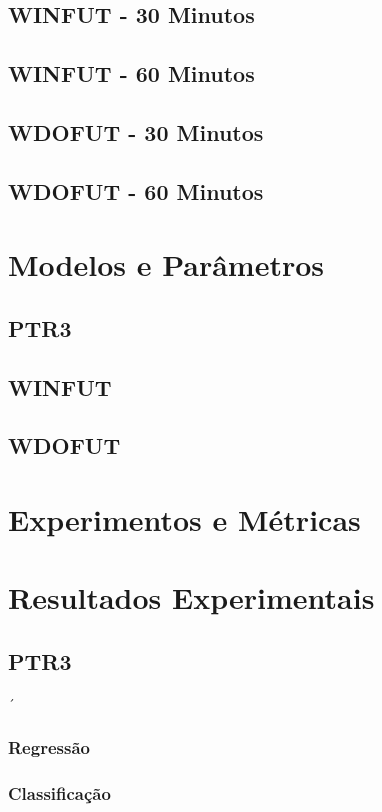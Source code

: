 \subsection{WINFUT - 30 Minutos}
\subsection{WINFUT - 60 Minutos}
\subsection{WDOFUT - 30 Minutos}
\subsection{WDOFUT - 60 Minutos}

\section{Modelos e Parâmetros}
\label{sec:modelos_parametros_resultados}
\subsection{PTR3}
\subsection{WINFUT}
\subsection{WDOFUT}

\section{Experimentos e Métricas}
\label{sec:experimentos _metricas}

\section{Resultados Experimentais}
\label{sec:resultados_experimentais}
\subsection{PTR3}´
\subsubsection{Regressão}
\subsubsection{Classificação}
